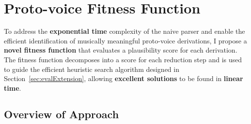 \documentclass[12pt,a4paper,twoside,openany]{report} \usepackage[pdfborder={0 0 0}]{hyperref}    %
\DeclareMathOperator*{\argmax}{arg\,max} \DeclareMathOperator*{\argmin}{arg\,min}
\theoremstyle{definition} \newtheorem{definition}{Definition}[section]
\begin{document}
%
%
%
%
%
    \newpage
    \section{Proto-voice Fitness Function}
    \label{sec:extensionImplementation}

    To address the \textbf{exponential time} complexity of the naive parser and enable the efficient identification of musically
    meaningful proto-voice derivations, I propose a \textbf{novel fitness function} that evaluates a plausibility score
    for each
    derivation. The fitness function decomposes into a score for each reduction step and is used to guide the
    efficient heuristic search algorithm designed in Section~\ref{sec:evalExtension}, allowing \textbf{excellent
    solutions} to be found in \textbf{linear time}.

    \subsection{Overview of Approach}
    \label{sub:heuristicDesign}
\end{document}
